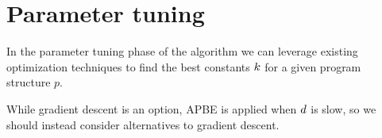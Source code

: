 \section{Parameter tuning}
\label{sec:opt}

In the parameter tuning phase of the algorithm we can leverage existing optimization techniques to find the best constants ${k}$ for a given program structure $p$.

While gradient descent is an option, APBE is applied when ${d}$ is slow, so we should instead consider alternatives to gradient descent.

